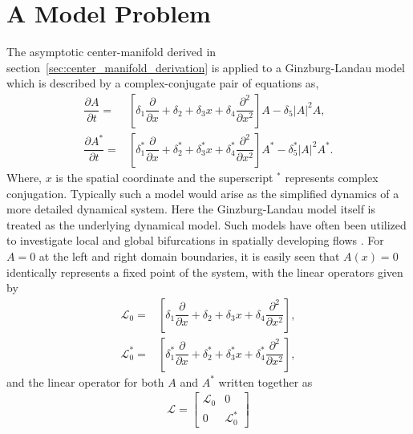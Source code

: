\section{A Model Problem}
\label{sec:ginzburg_landau}

The asymptotic center-manifold derived in section~\ref{sec:center_manifold_derivation} is applied to a Ginzburg-Landau model which is described by a complex-conjugate pair of equations as,
\begin{subequations}
	\label{eqn:ginzburg_landau}
	\begin{align}
		\dfrac{\partial A}{\partial t} =& \left[\delta_{1}\dfrac{\partial}{\partial x} + \delta_{2} + \delta_{3}x + \delta_{4}\dfrac{\partial^{2}}{\partial x^{2}}\right]A - \delta_{5}|A|^{2}A, \\
		\dfrac{\partial A^{*}}{\partial t} =& \left[\delta^{*}_{1}\dfrac{\partial}{\partial x} + \delta^{*}_{2} + \delta^{*}_{3}x + \delta^{*}_{4}\dfrac{\partial^{2}}{\partial x^{2}}\right]A^{*} - \delta^{*}_{5}|A|^{2}A^{*}. 
	\end{align}
\end{subequations}
Where, $x$ is the spatial coordinate and the superscript $^{*}$ represents complex conjugation. Typically such a model would arise as the simplified dynamics of a more detailed dynamical system. Here the Ginzburg-Landau model itself is treated as the underlying dynamical model. Such models have often been utilized to investigate local and global bifurcations in spatially developing flows \citep{chomaz88,chomaz05}. For $A=0$ at the left and right domain boundaries, it is easily seen that $A(x)=0$ identically represents a fixed point of the system, with the linear operators given by
\begin{align}
	\mathcal{L}_{0}	=& \left[\delta_{1}\dfrac{\partial}{\partial x} + \delta_{2} + \delta_{3}x + \delta_{4}\dfrac{\partial^{2}}{\partial x^{2}}\right], \nonumber \\
	\mathcal{L}^{*}_{0} =&\left[\delta^{*}_{1}\dfrac{\partial}{\partial x} + \delta^{*}_{2} + \delta^{*}_{3}x + \delta^{*}_{4}\dfrac{\partial^{2}}{\partial x^{2}}\right], \nonumber
\end{align}
and the linear operator for both $A$ and $A^{*}$ written together as
\begin{eqnarray}
	\mathcal{L} = \begin{bmatrix}
		\mathcal{L}_{0}		& 0 \\
		0								  & \mathcal{L}^{*}_{0}
	\end{bmatrix}
\end{eqnarray}

